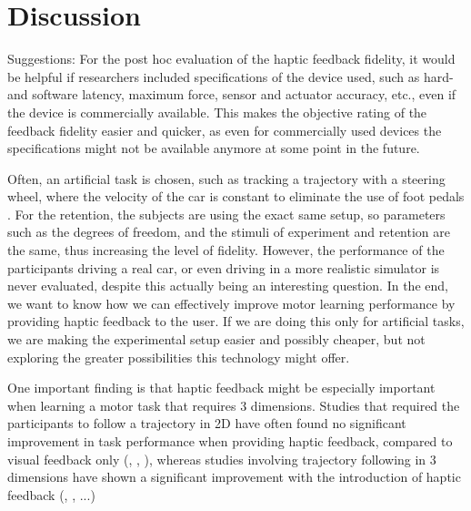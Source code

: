 
\section{Discussion}
Suggestions: For the post hoc evaluation of the haptic feedback fidelity, it would be helpful if researchers included specifications of the device used, such as hard- and software latency, maximum force, sensor and actuator accuracy, etc., even if the device is commercially available. This makes the objective rating of the feedback fidelity easier and quicker, as even for commercially used devices the specifications might not be available anymore at some point in the future.

Often, an artificial task is chosen, such as tracking a trajectory with a steering wheel, where the velocity of the car is constant to eliminate the use of foot pedals \cite{LeeH2014}. For the retention, the subjects are using the exact same setup, so parameters such as the degrees of freedom, and the stimuli of experiment and retention are the same, thus increasing the level of fidelity. However, the performance of the participants driving a real car, or even driving in a more realistic simulator is never evaluated, despite this actually being an interesting question. In the end, we want to know how we can effectively improve motor learning performance by providing haptic feedback to the user. If we are doing this only for artificial tasks, we are making the experimental setup easier and possibly cheaper, but not exploring the greater possibilities this technology might offer. 

One important finding is that haptic feedback might be especially important when learning a motor task that requires 3 dimensions. Studies that required the participants to follow a trajectory in 2D have often found no significant improvement in task performance when providing haptic feedback, compared to visual feedback only (\cite{Gambaro2014}, \cite{LiuG2014}, \cite{LeeH2014}), whereas studies involving trajectory following in 3 dimensions have shown a significant improvement with the introduction of haptic feedback (\cite{Grant2019}, \cite{Rodriguez2010}, ...)


